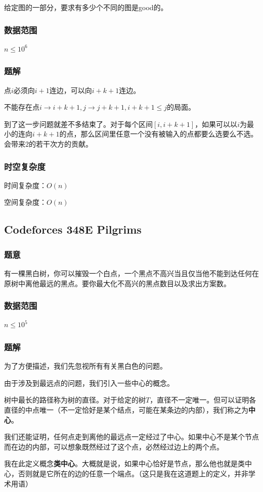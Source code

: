 \documentclass{ctexart}
\begin{document}
给定图的一部分，要求有多少个不同的图是good的。
\subsubsection{数据范围}
$n \le 10^6$
\subsubsection{题解}
点$i$必须向$i+1$连边，可以向$i+k+1$连边。

不能存在点$i \rightarrow i+k+1,j \rightarrow j+k+1,i+k+1 \le j$的局面。

到了这一步问题就差不多结束了。对于每个区间$[i,i+k+1]$，如果可以以$i$为最小的连向$i+k+1$的点，那么区间里任意一个没有被输入的点都要么选要么不选。会带来$2$的若干次方的贡献。
\subsubsection{时空复杂度}
时间复杂度：$O(n)$

空间复杂度：$O(n)$
\subsection{Codeforces 348E Pilgrims}
\subsubsection{题意}
有一棵黑白树，你可以摧毁一个白点，一个黑点不高兴当且仅当他不能到达任何在原树中离他最远的黑点。要你最大化不高兴的黑点数目以及求出方案数。
\subsubsection{数据范围}
$n \le 10^5$
\subsubsection{题解}
为了方便描述，我们先忽视所有有关黑白色的问题。

由于涉及到最远点的问题，我们引入一些中心的概念。

树中最长的路径称为树的直径。对于给定的树$T$，直径不一定唯一。但可以证明各直径的中点唯一（不一定恰好是某个结点，可能在某条边的内部），我们称之为{\textbf{中心}}。

我们还能证明，任何点走到离他的最远点一定经过了中心。如果中心不是某个节点而在边的内部，可以想象既然经过了这个点，必然经过边上的两个点。

我在此定义概念{\textbf{类中心}}。大概就是说，如果中心恰好是节点，那么他也就是类中心，否则就是它所在的边的任意一个端点。（这只是我在这道题上的定义，并非学术用语）
\end{document}

